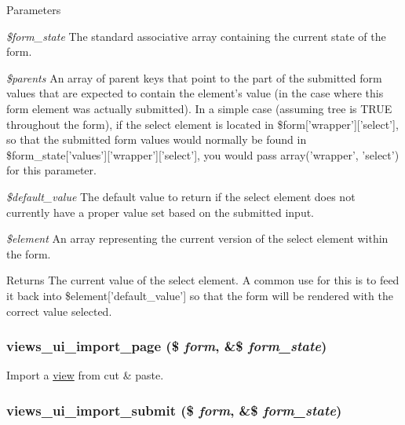 \begin{DoxyParams}{Parameters}
\item[{\em \$form\_\-state}]The standard associative array containing the current state of the form. \item[{\em \$parents}]An array of parent keys that point to the part of the submitted form values that are expected to contain the element's value (in the case where this form element was actually submitted). In a simple case (assuming tree is TRUE throughout the form), if the select element is located in \$form\mbox{[}'wrapper'\mbox{]}\mbox{[}'select'\mbox{]}, so that the submitted form values would normally be found in \$form\_\-state\mbox{[}'values'\mbox{]}\mbox{[}'wrapper'\mbox{]}\mbox{[}'select'\mbox{]}, you would pass array('wrapper', 'select') for this parameter. \item[{\em \$default\_\-value}]The default value to return if the select element does not currently have a proper value set based on the submitted input. \item[{\em \$element}]An array representing the current version of the select element within the form.\end{DoxyParams}
\begin{DoxyReturn}{Returns}
The current value of the select element. A common use for this is to feed it back into \$element\mbox{[}'default\_\-value'\mbox{]} so that the form will be rendered with the correct value selected. 
\end{DoxyReturn}
\hypertarget{admin_8inc_aa592ceb8e1152587900515340b0678a7}{
\subsubsection[{views\_\-ui\_\-import\_\-page}]{\setlength{\rightskip}{0pt plus 5cm}views\_\-ui\_\-import\_\-page (\$ {\em form}, \/  \&\$ {\em form\_\-state})}}
\label{admin_8inc_aa592ceb8e1152587900515340b0678a7}
Import a \hyperlink{classview}{view} from cut \& paste. \hypertarget{admin_8inc_af208375534e14a238da0f2979bd7c43e}{
\subsubsection[{views\_\-ui\_\-import\_\-submit}]{\setlength{\rightskip}{0pt plus 5cm}views\_\-ui\_\-import\_\-submit (\$ {\em form}, \/  \&\$ {\em form\_\-state})}}
